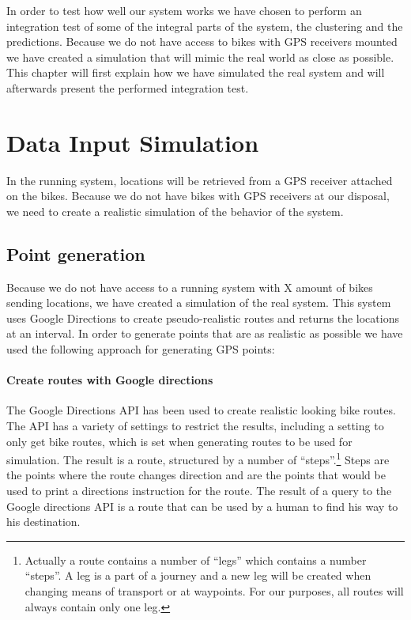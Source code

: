 In order to test how well our system works we have chosen to perform an integration test of some of the integral parts of the system, the clustering and the predictions.
Because we do not have access to bikes with GPS receivers mounted we have created a simulation that will mimic the real world as close as possible.
This chapter will first explain how we have simulated the real system and will afterwards present the performed integration test.

\section{Data Input Simulation}\label{design:datasimulation}
In the running system, locations will be retrieved from a GPS receiver attached on the bikes.
Because we do not have bikes with GPS receivers at our disposal, we need to create a realistic simulation of the behavior of the system.

\subsection{Point generation} \label{inputsimulation:pointgeneration}
Because we do not have access to a running system with X amount of bikes sending locations, we have created a simulation of the real system.
This system uses Google Directions to create pseudo-realistic routes and returns the locations at an interval.
In order to generate points that are as realistic as possible we have used the following approach for generating GPS points:

\paragraph{Create routes with Google directions} The Google Directions API \cite{gdirections} has been used to create realistic looking bike routes.
The API has a variety of settings to restrict the results, including a setting to only get bike routes, which is set when generating routes to be used for simulation.
The result is a route, structured by a number of ``steps''.\footnote{Actually a route contains a number of  ``legs'' which contains a number ``steps''. 
A leg is a part of a journey and a new leg will be created when changing means of transport or at waypoints.
For our purposes, all routes will always contain only one leg.}
Steps are the points where the route changes direction and are the points that would be used to print a directions instruction for the route.
The result of a query to the Google directions API is a route that can be used by a human to find his way to his destination.

